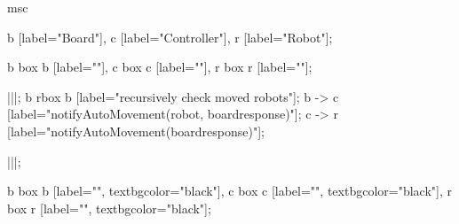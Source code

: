 
\begin{msc}
msc
{

b [label="Board"],
c [label="Controller"],
r [label="Robot"];

b box b [label=""],
c box c [label=""],
r box r [label=""];

|||;
b rbox b [label="recursively check moved robots"];
b -> c [label="notifyAutoMovement(robot, boardresponse)"];
c -> r [label="notifyAutoMovement(boardresponse)"];

|||;

b box b [label="", textbgcolor="black"],
c box c [label="", textbgcolor="black"],
r box r [label="", textbgcolor="black"];

}
\end{msc}
